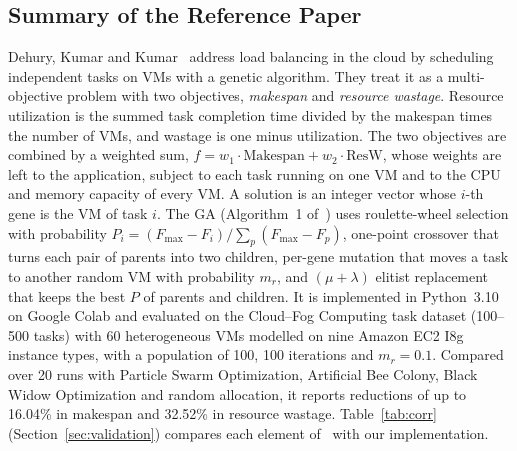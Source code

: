 \documentclass[journal,onecolumn,12pt]{IEEEtran}
\begin{document}
\subsection{Summary of the Reference Paper}
Dehury, Kumar and Kumar~\cite{dehury} address load balancing in the cloud by scheduling independent tasks on VMs with a genetic algorithm. They treat it as a multi-objective problem with two objectives, \emph{makespan} and \emph{resource wastage}. Resource utilization is the summed task completion time divided by the makespan times the number of VMs, and wastage is one minus utilization. The two objectives are combined by a weighted sum, $f=w_1\cdot\text{Makespan}+w_2\cdot\text{ResW}$, whose weights are left to the application, subject to each task running on one VM and to the CPU and memory capacity of every VM. A solution is an integer vector whose $i$-th gene is the VM of task $i$. The GA (Algorithm~1 of~\cite{dehury}) uses roulette-wheel selection with probability $P_i=(F_{\max}-F_i)/\sum_p(F_{\max}-F_p)$, one-point crossover that turns each pair of parents into two children, per-gene mutation that moves a task to another random VM with probability $m_r$, and $(\mu+\lambda)$ elitist replacement that keeps the best $P$ of parents and children. It is implemented in Python~3.10 on Google Colab and evaluated on the Cloud--Fog Computing task dataset (100--500 tasks) with 60 heterogeneous VMs modelled on nine Amazon EC2 I8g instance types, with a population of 100, 100 iterations and $m_r=0.1$. Compared over 20 runs with Particle Swarm Optimization, Artificial Bee Colony, Black Widow Optimization and random allocation, it reports reductions of up to 16.04\% in makespan and 32.52\% in resource wastage. Table~\ref{tab:corr} (Section~\ref{sec:validation}) compares each element of~\cite{dehury} with our implementation.
\end{document}
